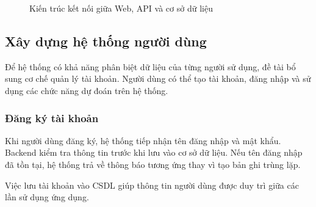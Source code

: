\documentclass[14pt]{extarticle}
\begin{document}
	\begin{figure}[htbp]
		\centering
		
		
		\caption{Kiến trúc kết nối giữa Web, API và cơ sở dữ liệu}

	\end{figure}
	
	
	\subsection{Xây dựng hệ thống người dùng}
	
	\noindent Để hệ thống có khả năng phân biệt dữ liệu của từng người sử dụng, đề tài bổ sung cơ chế quản lý tài khoản. Người dùng có thể tạo tài khoản, đăng nhập và sử dụng các chức năng dự đoán trên hệ thống.
	
	\subsubsection{Đăng ký tài khoản}
	
	\noindent Khi người dùng đăng ký, hệ thống tiếp nhận tên đăng nhập và mật khẩu. Backend kiểm tra thông tin trước khi lưu vào cơ sở dữ liệu. Nếu tên đăng nhập đã tồn tại, hệ thống trả về thông báo tương ứng thay vì tạo bản ghi trùng lặp.
	
	\noindent Việc lưu tài khoản vào CSDL giúp thông tin người dùng được duy trì giữa các lần sử dụng ứng dụng.
	
\end{document}
